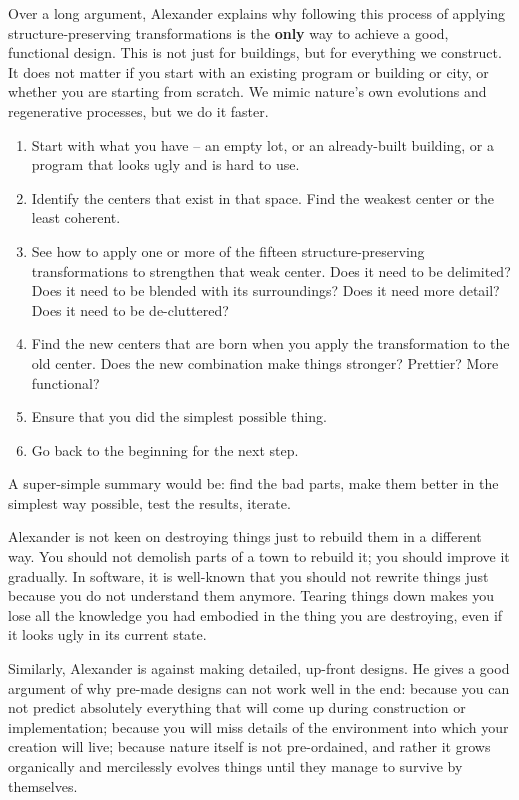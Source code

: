 Over a long argument, Alexander explains why following this process of applying
structure-preserving transformations is the \textbf{only} way to achieve a good,
functional design. This is not just for buildings, but for everything we
construct. It does not matter if you start with an existing program or building
or city, or whether you are starting from scratch. We mimic nature's own
evolutions and regenerative processes, but we do it faster.
\begin{enumerate}
 \item Start with what you have -- an empty lot, or an already-built building, or
a program that looks ugly and is hard to use.
 \item Identify the centers that exist in that space. Find the weakest center or
the least coherent.
 \item See how to apply one or more of the fifteen structure-preserving
transformations to strengthen that weak center. Does it need to be delimited?
Does it need to be blended with its surroundings? Does it need more detail? Does
it need to be de-cluttered?
 \item Find the new centers that are born when you apply the transformation to
the old center. Does the new combination make things stronger? Prettier? More
functional?
 \item Ensure that you did the simplest possible thing.
 \item Go back to the beginning for the next step.
\end{enumerate}
A super-simple summary would be: find the bad parts, make them better in the
simplest way possible, test the results, iterate.

Alexander is not keen on destroying things just to rebuild them in a different
way. You should  not demolish parts of a town to rebuild it; you should improve
it gradually. In software, it is well-known that you should not rewrite things
just because you do not understand them anymore. Tearing things down makes you
lose all the knowledge you had embodied in the thing you are destroying, even if
it looks ugly in its current state.

Similarly, Alexander is against making detailed, up-front designs. He gives a
good argument of why pre-made designs can not work well in the end: because you
can not predict absolutely everything that will come up during construction or
implementation; because you will miss details of the environment into which your
creation will live; because nature itself is not pre-ordained, and rather it
grows organically and mercilessly evolves things until they manage to survive by
themselves.

